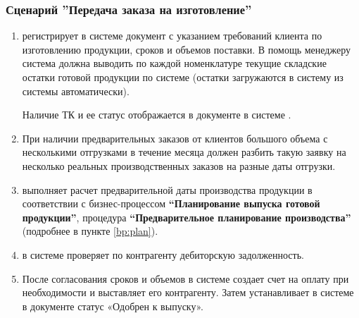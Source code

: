 \subsubsection{Сценарий ''Передача заказа на изготовление''}
\label{bp:sales_5}


\begin{enumerate}
\item \manager регистрирует в системе \gofro документ  с указанием требований клиента по изготовлению продукции, сроков и объемов поставки. В помощь менеджеру система \gofro должна выводить по каждой номенклатуре текущие складские остатки готовой продукции по системе \erp (остатки загружаются в систему \gofro из системы \erp автоматически).

Наличие ТК и ее статус отображается в документе  в системе \gofro.

\item	При наличии предварительных заказов от клиентов большого объема с несколькими отгрузками в течение месяца \manager должен разбить такую заявку на несколько реальных производственных заказов на разные даты отгрузки.
\item	\manager выполняет расчет предварительной даты производства продукции в соответствии с бизнес-процессом \textbf{“Планирование выпуска готовой продукции”}, процедура \textbf{“Предварительное планирование производства”} (подробнее в пункте \ref{bp:plan}).
\item	\manager в системе \erp проверяет по контрагенту дебиторскую задолженность.
 \item	После согласования сроков и объемов \manager в системе \erp создает счет на оплату при необходимости и выставляет его контрагенту. Затем \manager устанавливает в системе \gofro в документе  статус «Одобрен к выпуску». 


\end{enumerate}
